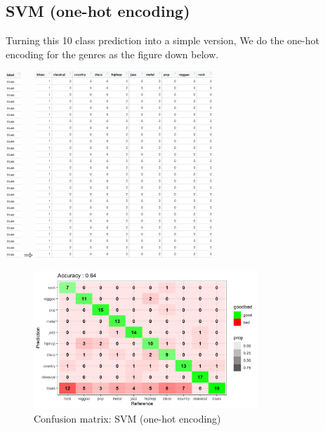 \documentclass[12pt,a4paper]{article}
\begin{document}
\subsection{SVM (one-hot encoding)}
Turning this 10 class prediction into a simple version, We do the one-hot encoding for the genres as the figure down below.

\begin{center}
    \includegraphics[width=0.043\textwidth]{y.jpg}$\Longrightarrow$\includegraphics[width=0.5\textwidth]{y_matrix.jpg}
\end{center}
\newpage

\begin{figure}[h]
    \includegraphics[width=0.75\textwidth]{confusionMatrix_ohencoding_std.png}
    \caption{Confusion matrix: SVM (one-hot encoding)}
\end{figure}
\end{document}
